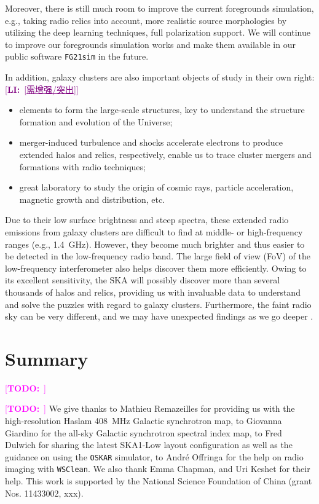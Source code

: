 \documentclass[modern]{aastex61}
\newcommand{\TODO}[1]{\textcolor{magenta}{[\textbf{TODO:}~\uuline{#1}]}}
\newcommand{\LI}[1]{\textcolor{purple}{[\textbf{LI:}~\uline{#1}]}}
\begin{document}
Moreover, there is still much room to improve the current foregrounds
simulation, e.g., taking radio relics into account, more realistic
source morphologies by utilizing the deep learning techniques,
full polarization support.
We will continue to improve our foregrounds simulation works and make
them available in our public software \texttt{FG21sim} in the future.

In addition, galaxy clusters are also important objects of study in their
own right:
\LI{[需增强/突出]}
\begin{itemize}
  \item elements to form the large-scale structures, key to understand the
    structure formation and evolution of the Universe;
  \item merger-induced turbulence and shocks accelerate electrons to produce
    extended halos and relics, respectively, enable us to trace cluster
    mergers and formations with radio techniques;
  \item great laboratory to study the origin of cosmic rays, particle
    acceleration, magnetic growth and distribution, etc.
\end{itemize}

Due to their low surface brightness and steep spectra, these extended
radio emissions from galaxy clusters are difficult to find at middle-
or high-frequency ranges (e.g., \SI{1.4}{\GHz}).
However, they become much brighter and thus easier to be detected in
the low-frequency radio band.  The large field of view (FoV) of the
low-frequency interferometer also helps discover them more efficiently.
Owing to its excellent sensitivity, the SKA will possibly discover more
than several thousands of halos and relics, providing us with invaluable
data to understand and solve the puzzles with regard to galaxy clusters.
Furthermore, the faint radio sky can be very different, and we may have
unexpected findings as we go deeper \citep{padovani2016rev,herreraRuiz2017}.


\section{Summary}
\label{sec:summary}

\TODO{Write!!!}


\acknowledgments

\TODO{update}
We give thanks
to Mathieu Remazeilles for providing us with the high-resolution Haslam
\SI{408}{\MHz} Galactic synchrotron map,
to Giovanna Giardino for the all-sky Galactic synchrotron spectral index map,
to Fred Dulwich for sharing the latest SKA1-Low layout configuration as well
as the guidance on using the \texttt{OSKAR} simulator,
to Andr\'e Offringa for the help on radio imaging with \texttt{WSClean}.
We also thank Emma Chapman, and Uri Keshet for their help.
This work is supported by the National Science Foundation of China
(grant Nos. 11433002, xxx).
\end{document}
